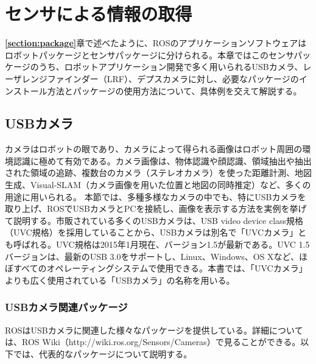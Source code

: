 
\chapter{センサによる情報の取得}
\label{section:sensor}

\textbf{\ref{section:package}}章で述べたように、ROSのアプリケーションソフトウェアはロボットパッケージとセンサパッケージに分けられる。本章ではこのセンサパッケージのうち、ロボットアプリケーション開発で多く用いられるUSBカメラ、レーザレンジファインダー（LRF）、デプスカメラに対し、必要なパッケージのインストール方法とパッケージの使用方法について、具体例を交えて解説する。

\section{USBカメラ}

カメラはロボットの眼であり、カメラによって得られる画像はロボット周囲の環境認識に極めて有効である。カメラ画像は、物体認識や顔認識、領域抽出や抽出された領域の追跡、複数台のカメラ（ステレオカメラ）を使った距離計測、地図生成、Visual-SLAM（カメラ画像を用いた位置と地図の同時推定）など、多くの用途に用いられる。
本節では、多種多様なカメラの中でも、特にUSBカメラを取り上げ、ROSでUSBカメラとPCを接続し、画像を表示する方法を実例を挙げて説明する。市販されている多くのUSBカメラは、USB video device class規格（UVC規格）を採用していることから、USBカメラは別名で「UVCカメラ」とも呼ばれる。UVC規格は2015年1月現在、バージョン1.5が最新である。UVC 1.5バージョンは、最新のUSB 3.0をサポートし、Linux、Windows、OS Xなど、ほぼすべてのオペレーティングシステムで使用できる。本書では、「UVCカメラ」よりも広く使用されている「USBカメラ」の名称を用いる。

\subsection{USBカメラ関連パッケージ}

ROSはUSBカメラに関連した様々なパッケージを提供している。詳細については、ROS Wiki（http://wiki.ros.org/Sensors/Cameras）で見ることができる。以下では、代表的なパッケージについて説明する。

